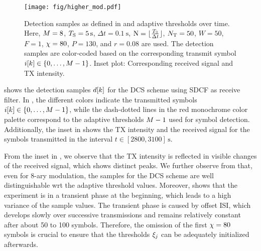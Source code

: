 \begin{figure}[!tbp]
\centering
    \vspace{-0.5cm}
  \texttt{[image: fig/higher\_mod.pdf]}\vspace*{-6mm}
  \caption{Detection samples as defined in  and adaptive thresholds over time. Here, $M = 8$, $\Ts = \SI{5}{\s}$, $\Delta t = \SI{0.1}{\s}$, $\mathrm{N} = \lfloor \frac{T_{\mathrm{S}}}{\Delta t} \rfloor$, $N_\mathrm{T} = 50$, $W = 50$, $F = 1$, $\chi = 80$, $P = 130$, and $r = 0.08$ are used. The detection samples are color-coded based on the corresponding transmit symbol $i[k] \in \{0, \ldots, M - 1\}$. Inset plot: Corresponding received signal and \ac{TX} intensity.}
  \label{fig:M8_detection}
  \vspace*{-0.8cm}
\end{figure}
%
 shows the detection samples $d[k]$ for the \ac{DCS} scheme using \ac{SDCF} as receive filter. In , the different colors indicate the transmitted symbols $i[k] \in \{0,\ldots,M - 1\}$, while the dash-dotted lines in the red monochrome color palette correspond to the adaptive thresholds $M - 1$ used for symbol detection. Additionally, the inset in  shows the \ac{TX} intensity and the received signal for the symbols transmitted in the interval $t \in [2800, 3100] \, \si{\s}$.

From the inset in , we observe that the \ac{TX} intensity is reflected in visible changes of the received signal, which shows distinct peaks. We further observe from  that, even for 8-ary modulation, the samples for the \ac{DCS} scheme are well distinguishable \ac{wrt} the adaptive threshold values. Moreover,  shows that the experiment is in a transient phase at the beginning, which leads to a high variance of the sample values. The transient phase is caused by offset \ac{ISI}, which develops slowly over successive transmissions and remains relatively constant after about 50 to 100 symbols. Therefore, the omission of the first $\chi = 80$ symbols is crucial to ensure that the thresholds $\xi_j$ can be adequately initialized afterwards. 
%
\scaleSubsubsection
